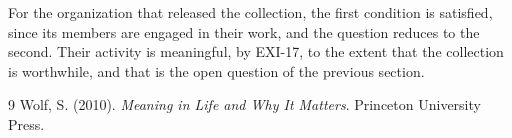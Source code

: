 \documentclass{situationist-preprint}
\begin{document}
For the organization that released the collection, the first condition is satisfied, since its members are engaged in their work, and the question reduces to the second. Their activity is meaningful, by EXI-17, to the extent that the collection is worthwhile, and that is the open question of the previous section.

\begin{thebibliography}{9}\small
{} Wolf, S. (2010). \emph{Meaning in Life and Why It Matters}. Princeton University Press.
\end{thebibliography}
\end{document}
